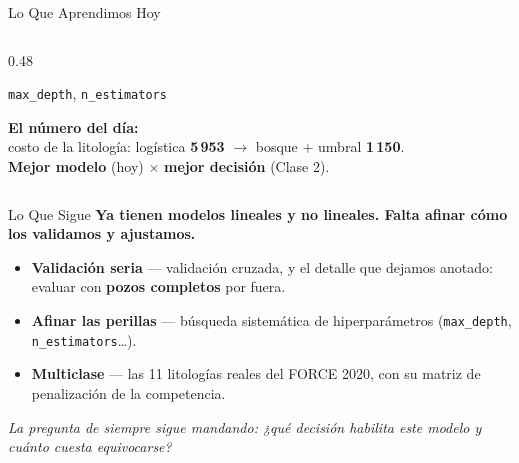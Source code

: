 \documentclass[aspectratio=169, 11pt]{beamer}
\begin{document}
\begin{frame}[shrink=8]{Lo Que Aprendimos Hoy}
\begin{columns}[T]
\begin{column}{0.48\textwidth}
{\begin{itemize}
          \texttt{max\_depth}, \texttt{n\_estimators}
      \end{itemize}
      }
      \vspace{8pt}
      \begin{tcolorbox}[colback=arcaGray, colframe=arcaRed, boxrule=0pt, leftrule=3pt,
        arc=3pt, left=6pt, right=6pt, top=5pt, bottom=5pt]
        {\scriptsize\color{arcaDark}\bfseries El número del día:}\\[3pt]
        {\scriptsize\color{textMuted}
          costo de la litología: logística \textbf{5\,953}
          \(\to\) bosque + umbral \textbf{1\,150}.\\[2pt]
          \textbf{Mejor modelo} (hoy) \(\times\) \textbf{mejor decisión}
          (Clase 2).}
      \end{tcolorbox}
    \end{column}
  \end{columns}
\end{frame}

\begin{frame}{Lo Que Sigue}
  \vspace{-6pt}
  {\small\color{arcaDark}\bfseries
    Ya tienen modelos lineales y no lineales. Falta afinar cómo los validamos y ajustamos.}

  \vspace{10pt}
  {\footnotesize
  \begin{itemize}\setlength{\itemsep}{7pt}
    \item[{\color{arcaRed}\Large\faArrowCircleRight}]
      \textbf{Validación seria} --- validación cruzada, y el detalle que dejamos
      anotado: evaluar con \textbf{pozos completos} por fuera.

    \item[{\color{arcaRed}\Large\faArrowCircleRight}]
      \textbf{Afinar las perillas} --- búsqueda sistemática de hiperparámetros
      (\texttt{max\_depth}, \texttt{n\_estimators}\ldots).

    \item[{\color{arcaRed}\Large\faArrowCircleRight}]
      \textbf{Multiclase} --- las 11 litologías reales del FORCE 2020, con
      su matriz de penalización de la competencia.
  \end{itemize}
  }

  \vspace{10pt}
  \centering
  {\footnotesize\color{arcaDark}\itshape
    La pregunta de siempre sigue mandando: ¿qué decisión habilita este modelo
    y cuánto cuesta equivocarse?}
\end{frame}
\end{document}
